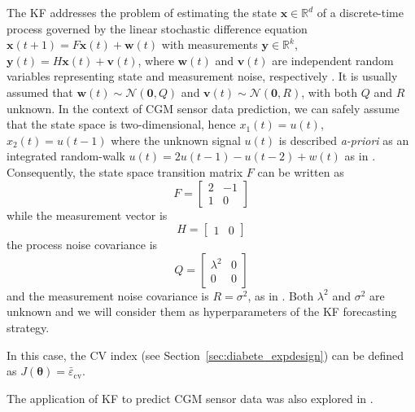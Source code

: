 The KF addresses the problem of estimating the state $\bm{x} \in \mathbb{R}^d$ of a discrete-time process governed by the linear stochastic difference equation
$\bm{x}(t+1) = F\bm{x}(t) + \bm{w}(t)$
with measurements $\bm{y} \in \mathbb{R}^k$,
$\bm{y}(t) = H\bm{x}(t)+\bm{v}(t)$,
where $\bm{w}(t)$ and $\bm{v}(t)$ are independent random variables representing state and measurement noise, respectively \cite{welch1995introduction}. It is usually assumed that $\bm{w}(t)\sim \mathcal{N}(\bm{0}, Q)$ and $\bm{v}(t)\sim \mathcal{N}(\bm{0}, R)$, with both $Q$ and $R$ unknown. In the context of CGM sensor data prediction, we can safely assume that the state space is two-dimensional, hence $x_1(t)=u(t)$, $x_2(t)=u(t-1)$ where the unknown signal $u(t)$ is described {\em a-priori} as an integrated random-walk $u(t)=2u(t-1)-u(t-2)+w(t)$ as in \cite{facchinetti2010online}. Consequently, the state space transition matrix $F$ can be written as
\begin{equation}\label{eq:F}
F=
\begin{bmatrix}
2 & -1  \\
1 & 0
\end{bmatrix}
\end{equation}
while the measurement vector is
$$
H =
\begin{bmatrix} 1 & 0
\end{bmatrix}
$$
the process noise covariance is
\begin{equation}\label{eq:Q}
Q=
\begin{bmatrix}
\lambda^2 & 0  \\
0 & 0
\end{bmatrix}
\end{equation}
and the measurement noise covariance is $R = \sigma^2$, as in \cite{facchinetti2010online}. Both $\lambda^2$ and $\sigma^2$ are unknown and we will consider them as hyperparameters of the KF forecasting strategy.

In this case, the CV index (see Section~\ref{sec:diabete_expdesign}) can be defined as $J(\bm{\theta})= \bar{\varepsilon}_{\text{cv}}$.

The application of KF to predict CGM sensor data was also explored in \cite{facchinetti2010online, knobbe2005extended}.

